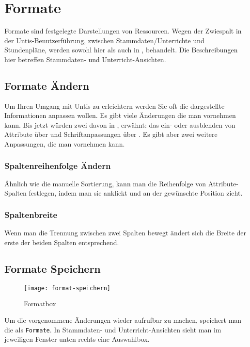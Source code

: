 \section{Formate}
\label{sec:formate-dialog}

Formate sind festgelegte Darstellungen von Ressourcen. Wegen der Zwiespalt in der Untis-Benutzerführung, zwischen Stammdaten/Unterrichte und Stundenpläne, werden sowohl hier als auch in , behandelt. Die Beschreibungen hier betreffen Stammdaten- und Unterricht-Ansichten.

\subsection{Formate Ändern}

Um Ihren Umgang mit Untis zu erleichtern werden Sie oft die dargestellte Informationen anpassen wollen. Es gibt viele Änderungen die man vornehmen kann. Bis jetzt würden zwei davon in , erwähnt: das ein- oder ausblenden von Attribute über  und Schriftanpassungen über  . Es gibt aber zwei weitere Anpassungen, die man vornehmen kann.

\subsubsection{Spaltenreihenfolge Ändern}

Ähnlich wie die manuelle Sortierung, kann man die Reihenfolge von Attribute-Spalten festlegen, indem man sie anklickt und an der gewünschte Position zieht.

\subsubsection{Spaltenbreite}
Wenn man die Trennung zwischen zwei Spalten bewegt ändert sich die Breite der erste der beiden Spalten entsprechend.

\newpage

\subsection{Formate Speichern}

\begin{wrapfigure}{r}{.4\textwidth}
	\vspace{-14pt}
	\centering
	\texttt{[image: format-speichern]}
	\vspace{-5pt}
	\caption{Formatbox}
	\label{fig:format-speichern}
\end{wrapfigure}

Um die vorgenommene Änderungen wieder aufrufbar zu machen, speichert man die als \texttt{Formate}. In Stammdaten- und Unterricht-Ansichten sieht man im jeweiligen Fenster unten rechts eine Auswahlbox.
